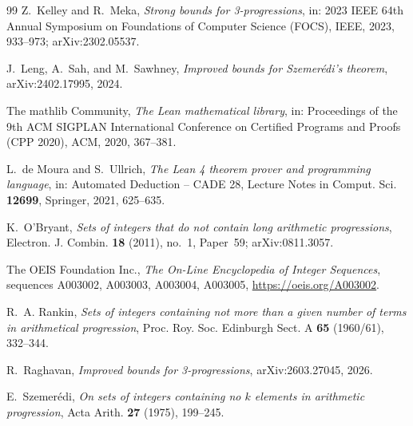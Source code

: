 \documentclass[11pt]{amsart}
\theoremstyle{plain}
\theoremstyle{definition}
\begin{document}
\begin{thebibliography}{99}
Z.~Kelley and R.~Meka, \emph{Strong bounds for 3-progressions}, in: 2023 IEEE 64th Annual Symposium on Foundations of Computer Science (FOCS), IEEE, 2023, 933--973; arXiv:2302.05537.

J.~Leng, A.~Sah, and M.~Sawhney, \emph{Improved bounds for Szemer\'edi's theorem}, arXiv:2402.17995, 2024.

The mathlib Community, \emph{The Lean mathematical library}, in: Proceedings of the 9th ACM SIGPLAN International Conference on Certified Programs and Proofs (CPP 2020), ACM, 2020, 367--381.

L.~de Moura and S.~Ullrich, \emph{The Lean 4 theorem prover and programming language}, in: Automated Deduction -- CADE 28, Lecture Notes in Comput. Sci. \textbf{12699}, Springer, 2021, 625--635.

K.~O'Bryant, \emph{Sets of integers that do not contain long arithmetic progressions}, Electron. J. Combin. \textbf{18} (2011), no.~1, Paper~59; arXiv:0811.3057.

The OEIS Foundation Inc., \emph{The On-Line Encyclopedia of Integer Sequences}, sequences A003002, A003003, A003004, A003005, \url{https://oeis.org/A003002}.

R.~A. Rankin, \emph{Sets of integers containing not more than a given number of terms in arithmetical progression}, Proc. Roy. Soc. Edinburgh Sect. A \textbf{65} (1960/61), 332--344.

R.~Raghavan, \emph{Improved bounds for 3-progressions}, arXiv:2603.27045, 2026.

E.~Szemer\'edi, \emph{On sets of integers containing no $k$ elements in arithmetic progression}, Acta Arith. \textbf{27} (1975), 199--245.

\end{thebibliography}
\end{document}

